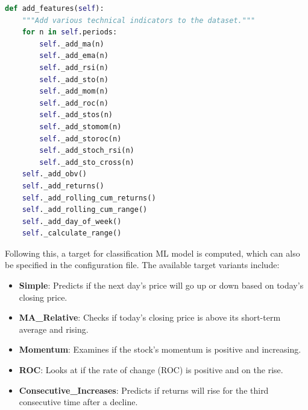 \noindent\begin{minipage}{\linewidth}
\begin{lstlisting}[style=pythonstyle, language=Python, caption={Function to add features to the dataset},  captionpos=b, label=lst:add_features_function]
def add_features(self):
    """Add various technical indicators to the dataset."""
    for n in self.periods:
        self._add_ma(n)
        self._add_ema(n)
        self._add_rsi(n)
        self._add_sto(n)
        self._add_mom(n)
        self._add_roc(n)
        self._add_stos(n)
        self._add_stomom(n)
        self._add_storoc(n)
        self._add_stoch_rsi(n)
        self._add_sto_cross(n)
    self._add_obv()
    self._add_returns()
    self._add_rolling_cum_returns()
    self._add_rolling_cum_range()
    self._add_day_of_week()
    self._calculate_range()

\end{lstlisting}
\end{minipage}


Following this, a target for classification ML model is computed, which can also be specified in the configuration file. The available target variants include:
\begin{itemize}
    \item \textbf{Simple}: Predicts if the next day's price will go up or down based on today's closing price.
    \item \textbf{MA\_Relative}: Checks if today's closing price is above its short-term average and rising.
    \item \textbf{Momentum}: Examines if the stock's momentum is positive and increasing.
    \item \textbf{ROC}: Looks at if the rate of change (ROC) is positive and on the rise.
    \item \textbf{Consecutive\_Increases}: Predicts if returns will rise for the third consecutive time after a decline.
\end{itemize}

